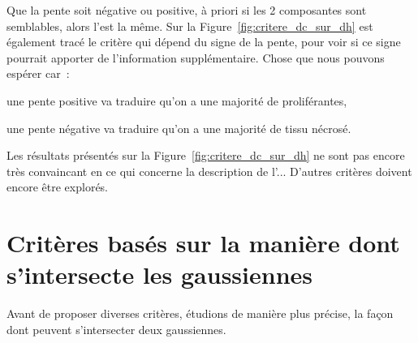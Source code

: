 \documentclass[main.tex]{subfiles}
\begin{document}
Que la pente soit négative ou positive, à priori si les 2 composantes sont semblables, alors l'\hetero est la même. Sur la Figure~\ref{fig:critere_dc_sur_dh} est également tracé le critère qui dépend du signe de la pente, pour voir si ce signe pourrait apporter de l'information supplémentaire. Chose que nous pouvons espérer car~:
\begin{myitemize}
\item une pente positive va traduire qu'on a une majorité de proliférantes,
\item une pente négative va traduire qu'on a une majorité de tissu nécrosé.
\end{myitemize}

Les résultats présentés sur la Figure~\ref{fig:critere_dc_sur_dh} ne sont pas encore très convaincant en ce qui concerne la description de l'\hetero... D'autres critères doivent encore être explorés.

\section{Critères basés sur la manière dont s'intersecte les gaussiennes}
Avant de proposer diverses critères, étudions de manière plus précise, la façon dont peuvent s'intersecter deux gaussiennes.
\end{document}
